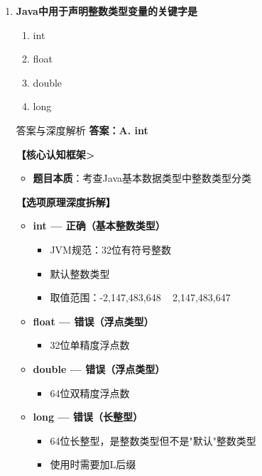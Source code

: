 \documentclass[12pt, a4paper]{ctexart}
\begin{document}
\begin{enumerate}[label=\textbf{\arabic*.}]
	      \vspace{1em}

	\item \textbf{Java中用于声明整数类型变量的关键字是}
	      \begin{enumerate}[label=\Alph*.]
		      \item int
		      \item float
		      \item double
		      \item long
	      \end{enumerate}

	      \begin{bluebox}{答案与深度解析}
		      \textbf{答案：A. int}

		      \textbf{【核心认知框架>}
		      \begin{itemize}[label={}, leftmargin=*, nosep]
			      \item \textbf{题目本质}：考查Java基本数据类型中整数类型分类
		      \end{itemize}

		      \textbf{【选项原理深度拆解】}

		      \begin{itemize}[leftmargin=*, nosep, label={}]
			      \item[A] \textbf{int — 正确（基本整数类型）}
			      \begin{itemize}[label={}, nosep]
				      \item JVM规范：32位有符号整数
				      \item 默认整数类型
				      \item 取值范围：-2,147,483,648 ~ 2,147,483,647
			      \end{itemize}

			      \item[B] \textbf{float — 错误（浮点类型）}
			      \begin{itemize}[label={}, nosep]
				      \item 32位单精度浮点数
			      \end{itemize}

			      \item[C] \textbf{double — 错误（浮点类型）}
			      \begin{itemize}[label={}, nosep]
				      \item 64位双精度浮点数
			      \end{itemize}

			      \item[D] \textbf{long — 错误（长整型）}
			      \begin{itemize}[label={}, nosep]
				      \item 64位长整型，是整数类型但不是"默认"整数类型
				      \item 使用时需要加L后缀
			      \end{itemize}
		      \end{itemize}


\end{bluebox}
\end{enumerate}
\end{document}
